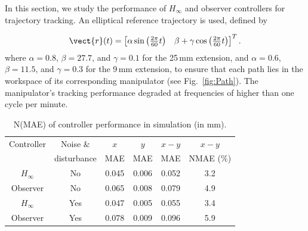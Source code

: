 In this section, we study the performance of $H_\infty$ and observer controllers for trajectory tracking. An elliptical reference trajectory is used, defined by

\begin{align}
\vect{r}(t)= \begin{bmatrix} \alpha\sin\left(\frac{2\pi}{60}t\right) & \beta+\gamma\cos\left(\frac{2\pi}{60} t\right)
\end{bmatrix}^T. 
\end{align}
where $\alpha=0.8$, $\beta=27.7$, and $\gamma=0.1$ for the 25\,mm extension, and $\alpha=0.6$, $\beta=11.5$, and $\gamma=0.3$ for the 9\,mm extension, to ensure that each path lies in the workspace of its corresponding manipulator (see Fig.~\ref{fig:Path}). The manipulator's tracking performance degraded at frequencies of higher than one cycle per minute.%



\begin{table}[t]
\centering
\caption{N(MAE) of controller performance in simulation (in mm).}
\begin{tabular}{c c c c c c}
\hline
Controller&Noise $\&$& $x$ & $y$& $x-y$& $x-y$\\
           &disturbance& MAE & MAE & MAE & NMAE ($\%$)\\
\hline
$H_{\infty}$       & No & 0.045 & 0.006 & 0.052 & 3.2\\
Observer            & No & 0.065 & 0.008 & 0.079 & 4.9\\
$H_{\infty}$ & Yes & 0.047 & 0.005 & 0.055 & 3.4\\
Observer & Yes & 0.078 & 0.009 & 0.096 & 5.9\\
\hline
\end{tabular}
\label{table:sim}
\vspace{-4mm}
\end{table}

